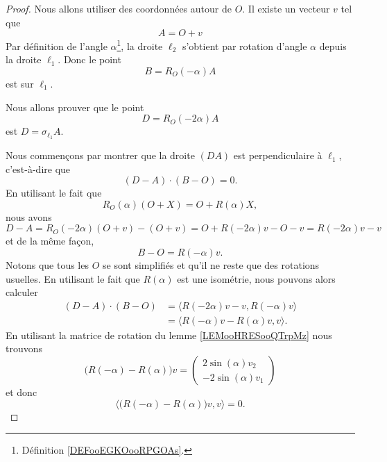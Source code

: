 \begin{proof}
    Nous allons utiliser des coordonnées autour de \( O\). Il existe un vecteur \( v\) tel que
    \begin{equation}
        A=O+v
    \end{equation}
    Par définition de l'angle \( \alpha\)\footnote{Définition \ref{DEFooEGKOooRPGOAs}.}, la droite \( \ell_2\) s'obtient par rotation d'angle \( \alpha\) depuis la droite \( \ell_1\). Donc le point
    \begin{equation}
        B=R_O(-\alpha)A
    \end{equation}
    est sur \( \ell_1\).

    Nous allons prouver que le point
    \begin{equation}
        D=R_O(-2\alpha)A
    \end{equation}
    est \( D=\sigma_{\ell_1}A\).

    Nous commençons par montrer que la droite \( (DA)\) est perpendiculaire à \( \ell_1\), c'est-à-dire que
    \begin{equation}
        (D-A)\cdot (B-O)=0.
    \end{equation}
    En utilisant le fait que
    \begin{equation}
        R_O(\alpha)(O+X)=O+R(\alpha)X,
    \end{equation}
    nous avons
    \begin{equation}
        D-A=R_O(-2\alpha)(O+v)-(O+v)=O+R(-2\alpha)v-O-v=R(-2\alpha)v-v
    \end{equation}
    et de la même façon,
    \begin{equation}
        B-O=R(-\alpha)v.
    \end{equation}
    Notons que tous les \( O\) se sont simplifiés et qu'il ne reste que des rotations usuelles. En utilisant le fait que \( R(\alpha)\) est une isométrie, nous pouvons alors calculer
    \begin{subequations}
        \begin{align}
            (D-A)\cdot (B-O)&=\langle R(-2\alpha)v-v, R(-\alpha)v\rangle \\
            &=\langle R(-\alpha)v-R(\alpha)v, v\rangle.
        \end{align}
    \end{subequations}
    En utilisant la matrice de rotation du lemme \ref{LEMooHRESooQTrpMz} nous trouvons
    \begin{equation}
        \big( R(-\alpha)-R(\alpha) \big)v=\begin{pmatrix}
            2\sin(\alpha)v_2    \\
            -2\sin(\alpha)v_1
        \end{pmatrix}
    \end{equation}
    et donc
    \begin{equation}
        \langle  \big( R(-\alpha)-R(\alpha) \big)v  , v\rangle =0.
    \end{equation}


\end{proof}
